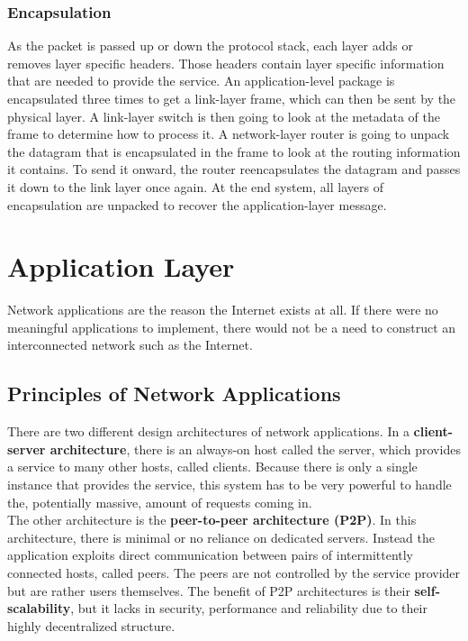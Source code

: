 \subsubsection{Encapsulation}
As the packet is passed up or down the protocol stack, each layer adds or removes layer specific headers. Those headers contain layer specific information that are needed to provide the service. An application-level package is encapsulated three times to get a link-layer frame, which can then be sent by the physical layer. A link-layer switch is then going to look at the metadata of the frame to determine how to process it. A network-layer router is going to unpack the datagram that is encapsulated in the frame to look at the routing information it contains. To send it onward, the router reencapsulates the datagram and passes it down to the link layer once again. At the end system, all layers of encapsulation are unpacked to recover the application-layer message.

\section{Application Layer}
Network applications are the reason the Internet exists at all. If there were no meaningful applications to implement, there would not be a need to construct an interconnected network such as the Internet.

\subsection{Principles of Network Applications}
There are two different design architectures of network applications. In a \textbf{client-server architecture}, there is an always-on host called the server, which provides a service to many other hosts, called clients. Because there is only a single instance that provides the service, this system has to be very powerful to handle the, potentially massive, amount of requests coming in. \\
The other architecture is the \textbf{peer-to-peer architecture (P2P)}. In this architecture, there is minimal or no reliance on dedicated servers. Instead the application exploits direct communication between pairs of intermittently connected hosts, called peers. The peers are not controlled by the service provider but are rather users themselves. The benefit of P2P architectures is their \textbf{self-scalability}, but it lacks in security, performance and reliability due to their highly decentralized structure.\vspace{.3cm}\\

